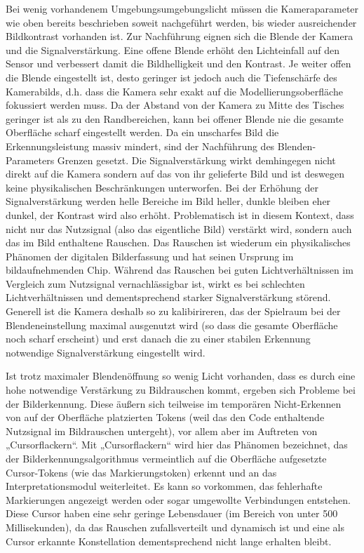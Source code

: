Bei wenig vorhandenem Umgebungsumgebungslicht müssen die Kameraparameter wie oben bereits beschrieben soweit nachgeführt werden, bis wieder ausreichender Bildkontrast vorhanden ist. Zur Nachführung eignen sich die Blende der Kamera und die Signalverstärkung. Eine offene Blende erhöht den Lichteinfall auf den Sensor und verbessert damit die Bildhelligkeit und den Kontrast. Je weiter offen die Blende eingestellt ist, desto geringer ist jedoch auch die Tiefenschärfe des Kamerabilds, d.h. dass die Kamera sehr exakt auf die Modellierungsoberfläche fokussiert werden muss. Da der Abstand von der Kamera zu Mitte des Tisches geringer ist als zu den Randbereichen, kann bei offener Blende nie die gesamte Oberfläche scharf eingestellt werden. Da ein unscharfes Bild die Erkennungsleistung massiv mindert, sind der Nachführung des Blenden-Parameters Grenzen gesetzt. Die Signalverstärkung wirkt demhingegen nicht direkt auf die Kamera sondern auf das von ihr gelieferte Bild und ist deswegen keine physikalischen Beschränkungen unterworfen. Bei der Erhöhung der Signalverstärkung werden helle Bereiche im Bild heller, dunkle bleiben eher dunkel, der Kontrast wird also erhöht. Problematisch ist in diesem Kontext, dass nicht nur das Nutzsignal (also das eigentliche Bild) verstärkt wird, sondern auch das im Bild enthaltene Rauschen. Das Rauschen ist wiederum ein physikalisches Phänomen der digitalen Bilderfassung und hat seinen Ursprung im bildaufnehmenden Chip. Während das Rauschen bei guten Lichtverhältnissen im Vergleich zum Nutzsignal vernachlässigbar ist, wirkt es bei schlechten Lichtverhältnissen und dementsprechend starker Signalverstärkung störend. Generell ist die Kamera deshalb so zu kalibirireren, das der Spielraum bei der Blendeneinstellung maximal ausgenutzt wird (so dass die gesamte Oberfläche noch scharf erscheint) und erst danach die zu einer stabilen Erkennung notwendige Signalverstärkung eingestellt wird.

Ist trotz maximaler Blendenöffnung so wenig Licht vorhanden, dass es durch eine hohe notwendige Verstärkung zu Bildrauschen kommt, ergeben sich Probleme bei der Bilderkennung. Diese äußern sich teilweise im temporären Nicht-Erkennen von auf der Oberfläche platzierten Tokens (weil das den Code enthaltende Nutzsignal im Bildrauschen untergeht), vor allem aber im Auftreten von „Cursorflackern“. Mit „Cursorflackern“ wird hier das Phänomen bezeichnet, das der Bilderkennungsalgorithmus vermeintlich auf die Oberfläche aufgesetzte Cursor-Tokens (wie das Markierungstoken) erkennt und an das Interpretationsmodul weiterleitet. Es kann so vorkommen, das fehlerhafte Markierungen angezeigt werden oder sogar umgewollte Verbindungen entstehen. Diese Cursor haben eine sehr geringe Lebensdauer (im Bereich von unter 500 Millisekunden), da das Rauschen zufallsverteilt und dynamisch ist und eine als Cursor erkannte Konstellation dementsprechend nicht lange erhalten bleibt. 


